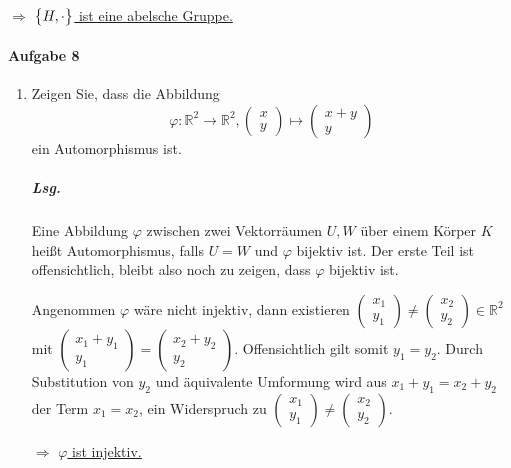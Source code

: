 \documentclass{scrreprt}
\begin{document}
$\Rightarrow$ \underline{$\qty\big{H, \cdot}$ ist eine abelsche Gruppe.}

\paragraph{Aufgabe 8}
\begin{enumerate}[(1)]
\item Zeigen Sie, dass die Abbildung
  \[
    \varphi \colon \mathbb{R}^2 \to \mathbb{R}^2,
    \begin{pmatrix}
      x \\
      y
    \end{pmatrix}
    \mapsto
    \begin{pmatrix}
      x + y \\
      y
    \end{pmatrix}
  \]
  ein Automorphismus ist.

  \subparagraph{Lsg.} Eine Abbildung $\varphi$ zwischen zwei Vektorräumen
  $U, W$ über einem Körper $K$ heißt Automorphismus, falls $U = W$ und
  $\varphi$ bijektiv ist.
  Der erste Teil ist offensichtlich, bleibt also noch zu zeigen, dass
  $\varphi$ bijektiv ist.

  Angenommen $\varphi$ wäre nicht injektiv, dann existieren
  $\begin{pmatrix} x_1 \\ y_1 \end{pmatrix} \ne
  \begin{pmatrix} x_2 \\ y_2 \end{pmatrix} \in \mathbb{R}^2$
  mit $\begin{pmatrix} x_1 + y_1 \\ y_1 \end{pmatrix} =
  \begin{pmatrix} x_2 + y_2 \\ y_2 \end{pmatrix}$.
  Offensichtlich gilt somit $y_1 = y_2$.
  Durch Substitution von $y_2$ und äquivalente Umformung wird aus
  $x_1 + y_1 = x_2 + y_2$ der Term $x_1 = x_2$, ein Widerspruch zu
  $\begin{pmatrix} x_1 \\ y_1 \end{pmatrix} \ne
  \begin{pmatrix} x_2 \\ y_2 \end{pmatrix}$.

  $\Rightarrow$ \underline{$\varphi$ ist injektiv.}


\end{enumerate}
\end{document}
